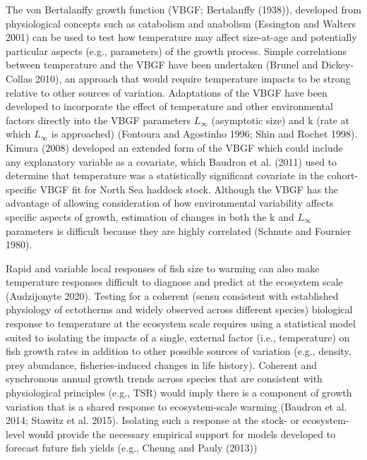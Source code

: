 \documentclass[
]{article}
\begin{document}
The von Bertalanffy growth function (VBGF; Bertalanffy (1938)),
developed from physiological concepts such as catabolism and anabolism
(Essington and Walters 2001) can be used to test how temperature may
affect size-at-age and potentially particular aspects (e.g., parameters)
of the growth process. Simple correlations between temperature and the
VBGF have been undertaken (Brunel and Dickey-Collas 2010), an approach
that would require temperature impacts to be strong relative to other
sources of variation. Adaptations of the VBGF have been developed to
incorporate the effect of temperature and other environmental factors
directly into the VBGF parameters \(L_\infty\) (asymptotic size) and k
(rate at which \(L_\infty\) is approached) (Fontoura and Agostinho 1996;
Shin and Rochet 1998). Kimura (2008) developed an extended form of the
VBGF which could include any explanatory variable as a covariate, which
Baudron et al. (2011) used to determine that temperature was a
statistically significant covariate in the cohort-specific VBGF fit for
North Sea haddock stock. Although the VBGF has the advantage of allowing
consideration of how environmental variability affects specific aspects
of growth, estimation of changes in both the k and \(L_\infty\)
parameters is difficult because they are highly correlated (Schnute and
Fournier 1980).

Rapid and variable local responses of fish size to warming can also make
temperature responses difficult to diagnose and predict at the ecosystem
scale (Audzijonyte 2020). Testing for a coherent (sensu consistent with
established physiology of ectotherms and widely observed across
different species) biological response to temperature at the ecosystem
scale requires using a statistical model suited to isolating the impacts
of a single, external factor (i.e., temperature) on fish growth rates in
addition to other possible sources of variation (e.g., density, prey
abundance, fisheries-induced changes in life history). Coherent and
synchronous annual growth trends across species that are consistent with
physiological principles (e.g., TSR) would imply there is a component of
growth variation that is a shared response to ecosystem-scale warming
(Baudron et al. 2014; Stawitz et al. 2015). Isolating such a response at
the stock- or ecosystem-level would provide the necessary empirical
support for models developed to forecast future fish yields (e.g.,
Cheung and Pauly (2013))
\end{document}
